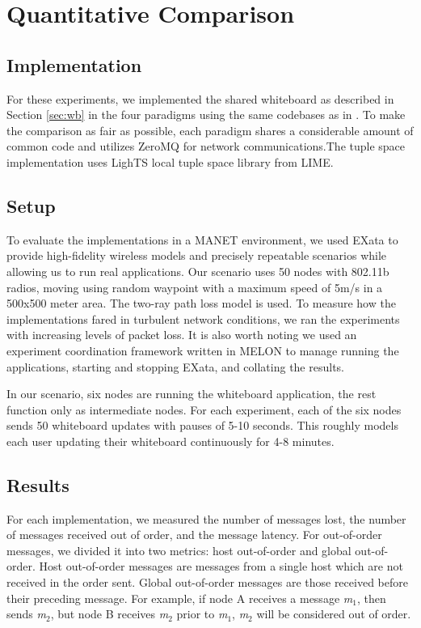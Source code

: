 \documentclass{llncs}
\begin{document}
\section{Quantitative Comparison}\label{sec:comparison}

\subsection{Implementation}

For these experiments, we implemented the shared whiteboard as described in Section \ref{sec:wb} in the four paradigms using the same codebases as in \cite{melon}. To make the comparison as fair as possible, each paradigm shares a considerable amount of common code and utilizes ZeroMQ for network communications.The tuple space implementation uses LighTS\cite{lights} local tuple space library from LIME.

\subsection{Setup}

To evaluate the implementations in a MANET environment, we used EXata\cite{exata} to provide high-fidelity wireless models and precisely repeatable scenarios while allowing us to run real applications. Our scenario uses 50 nodes with 802.11b radios, moving using random waypoint with a maximum speed of 5m/s in a 500x500 meter area. The two-ray path loss model is used. To measure how the implementations fared in turbulent network conditions, we ran the experiments with increasing levels of packet loss. It is also worth noting we used an experiment coordination framework written in MELON to manage running the applications, starting and stopping EXata, and collating the results.

In our scenario, six nodes are running the whiteboard application, the rest function only as intermediate nodes. For each experiment, each of the six nodes sends 50 whiteboard updates with pauses of 5-10 seconds. This roughly models each user updating their whiteboard continuously for 4-8 minutes.

\subsection{Results}

For each implementation, we measured the number of messages lost, the number of messages received out of order, and the message latency. For out-of-order messages, we divided it into two metrics: host out-of-order and global out-of-order. Host out-of-order messages are messages from a single host which are not received in the order sent. Global out-of-order messages are those received before their preceding message. For example, if node A receives a message \textit{m}$_{1}$, then sends \textit{m}$_{2}$, but node B receives \textit{m}$_{2}$ prior to \textit{m}$_{1}$, \textit{m}$_{2}$ will be considered out of order.
\end{document}
